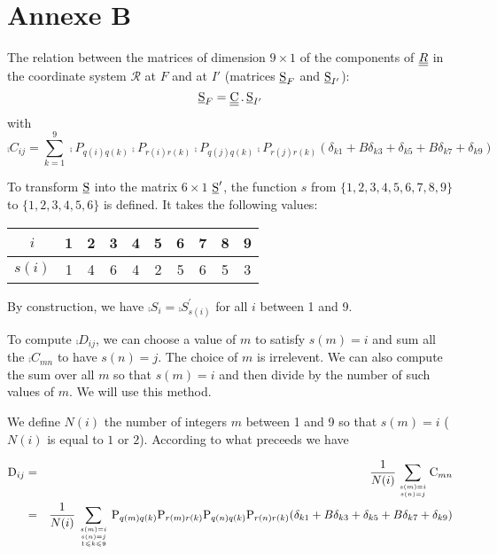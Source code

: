 \section*{Annexe B}

The relation between the matrices of dimension $9\times1$
of the components of $\underline{\underline{R}}$ in the coordinate system $\mathcal{R}$ at $F$ and at $I'$
(matrices $\underline{\textrm{S}}_F$ and $\underline{\textrm{S}}_{I'}$):
\begin{equation}
\underline{\textrm{S}}_F=\underline{\underline{\textrm{C}}}\,.\,\underline{\textrm{S}}_{I'}
\end{equation}
with
\begin{equation}
\comp{C}_{ij}=\sum_{k=1}^9
\comp{P}_{q(i)q(k)}\comp{P}_{r(i)r(k)}\comp{P}_{q(j)q(k)}\comp{P}_{r(j)r(k)}
(\delta_{k1}+B \delta_{k3}+\delta_{k5}+B \delta_{k7}+\delta_{k9})
\end{equation}

To transform $\underline{\textrm{S}}$ into the matrix $6\times 1$ $\underline{\textrm{S}}^\prime$,
the function $s$ from $\{1,2,3,4,5,6,7,8,9\}$ to
$\{1,2,3,4,5,6\}$ is defined. It takes the following values:
\begin{center}
\begin{tabular}{|c|c|c|c|c|c|c|c|c|c|}
\hline
$i$&1&2&3&4&5&6&7&8&9\\
\hline
$s(i)$&1&4&6&4&2&5&6&5&3\\
\hline
\end{tabular}
\end{center}
By construction, we have $\comp{S}_i=\comp{S}^\prime_{s(i)}$ for all $i$ between 1
and 9.

To compute $\comp{D}_{ij}$, we can choose a value of $m$ to satisfy
$s(m)=i$ and sum all the $\comp{C}_{mn}$ to have $s(n)=j$. The choice of $m$
is irrelevent. We can also compute the sum over all $m$ so that  $s(m)=i$ and then
divide by the number of such values of $m$. We will use this method.

We define $N(i)$ the number of integers $m$ between 1 and 9 so that $s(m)=i$ ($N(i)$ is equal to $1$ or $2$).
According to what preceeds we have

\begin{eqnarray}
\textrm{D}_{ij}&=&\frac{1}{N(i)}\sum_{s(m)=i \atop s(n)=j}\textrm{C}_{mn}\\
&=&\frac{1}{N(i)}\sum_{{s(m)=i \atop s(n)=j}\atop 1\leqslant k\leqslant 9}
\textrm{P}_{q(m)q(k)}\textrm{P}_{r(m)r(k)}\textrm{P}_{q(n)q(k)}\textrm{P}_{r(n)r(k)}
(\delta_{k1}+B \delta_{k3}+\delta_{k5}+B\delta_{k7}+\delta_{k9})\nonumber
\end{eqnarray}

